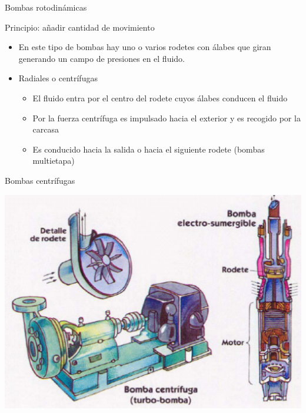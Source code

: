 \documentclass[xcolor={usenames,svgnames,dvipsnames}]{beamer}
\begin{document}
\begin{frame}[label={sec:org26ea24d}]{Bombas rotodinámicas}
\begin{block}{\alert{Principio}: añadir cantidad de movimiento}
\begin{itemize}
\item En este tipo de bombas hay uno o varios rodetes con álabes que giran generando un campo de presiones en el fluido.

\item \alert{Radiales o centrífugas}

\begin{itemize}
\item El fluido entra por el centro del rodete cuyos álabes conducen el fluido

\item Por la fuerza centrífuga es impulsado hacia el exterior y es recogido por la carcasa

\item Es conducido hacia la salida o hacia el siguiente rodete (bombas multietapa)
\end{itemize}
\end{itemize}
\end{block}
\end{frame}

\begin{frame}[label={sec:org72c5f7a}]{Bombas centrífugas}
\begin{center}
\includegraphics[width=.9\linewidth]{../figs/BombaCentrifuga.pdf}
\end{center}
\end{frame}
\end{document}

